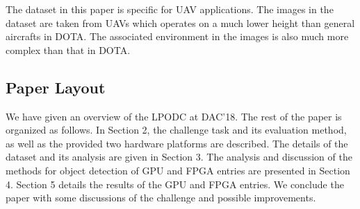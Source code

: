 \documentclass[10pt,journal,compsoc]{IEEEtran}
\begin{document}
The dataset in this paper is specific for UAV applications.
The images in the dataset are taken from UAVs which operates on a much lower height than general aircrafts in DOTA.
The associated environment in the images is also much more complex than that in DOTA.

\subsection{Paper Layout}

We have given an overview of the LPODC at DAC'18.
The rest of the paper is organized as follows. In Section 2,
the challenge task and its evaluation method, as well as the provided two hardware platforms are described.
The details of the dataset and its analysis are given in Section 3.
The analysis and discussion of the methods for object detection of GPU and FPGA entries are presented in Section 4.
Section 5 details the results of the GPU and FPGA entries.
We conclude the paper with some discussions of the challenge and possible improvements.






%
%

\end{document}
